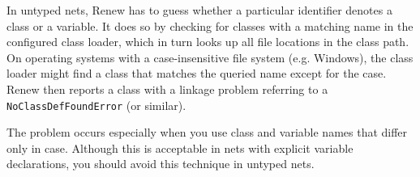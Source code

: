 In untyped nets, Renew has to guess whether a particular identifier denotes
a class or a variable.
It does so by checking for classes with a matching name in the configured
class loader, which in turn looks up all file locations in the class path.
On operating systems with a case-insensitive file system (e.g. Windows),
the class loader might find a class that matches the queried name except
for the case.
Renew then reports a class with a linkage problem referring to a
\texttt{NoClassDefFoundError} (or similar).

The problem occurs especially when you use class and variable names that
differ only in case.
Although this is acceptable in nets with explicit variable declarations,
you should avoid this technique in untyped nets.


